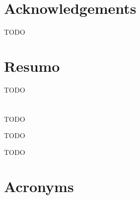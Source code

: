 \cleardoublepage
\chapter*{Acknowledgements}
TODO

\cleardoublepage
\chapter*{Resumo}
TODO

\cleardoublepage
\chapter*{\abstractname}
TODO

\cleardoublepage
{}
\begin{keywords}
 TODO

 TODO
\end{keywords}

\cleardoublepage
{}
\tableofcontents

\cleardoublepage
\listoffigures

\cleardoublepage
\listoftables

\cleardoublepage
\chapter*{Acronyms}


